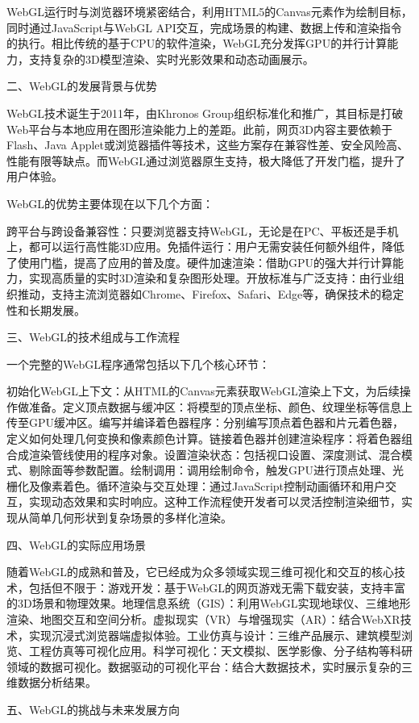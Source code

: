 WebGL运行时与浏览器环境紧密结合，利用HTML5的Canvas元素作为绘制目标，同时通过JavaScript与WebGL API交互，完成场景的构建、数据上传和渲染指令的执行。相比传统的基于CPU的软件渲染，WebGL充分发挥GPU的并行计算能力，支持复杂的3D模型渲染、实时光影效果和动态动画展示。

二、WebGL的发展背景与优势

WebGL技术诞生于2011年，由Khronos Group组织标准化和推广，其目标是打破Web平台与本地应用在图形渲染能力上的差距。此前，网页3D内容主要依赖于Flash、Java Applet或浏览器插件等技术，这些方案存在兼容性差、安全风险高、性能有限等缺点。而WebGL通过浏览器原生支持，极大降低了开发门槛，提升了用户体验。

WebGL的优势主要体现在以下几个方面：

跨平台与跨设备兼容性：只要浏览器支持WebGL，无论是在PC、平板还是手机上，都可以运行高性能3D应用。免插件运行：用户无需安装任何额外组件，降低了使用门槛，提高了应用的普及度。硬件加速渲染：借助GPU的强大并行计算能力，实现高质量的实时3D渲染和复杂图形处理。开放标准与广泛支持：由行业组织推动，支持主流浏览器如Chrome、Firefox、Safari、Edge等，确保技术的稳定性和长期发展。

三、WebGL的技术组成与工作流程

一个完整的WebGL程序通常包括以下几个核心环节：

初始化WebGL上下文：从HTML的Canvas元素获取WebGL渲染上下文，为后续操作做准备。定义顶点数据与缓冲区：将模型的顶点坐标、颜色、纹理坐标等信息上传至GPU缓冲区。编写并编译着色器程序：分别编写顶点着色器和片元着色器，定义如何处理几何变换和像素颜色计算。链接着色器并创建渲染程序：将着色器组合成渲染管线使用的程序对象。设置渲染状态：包括视口设置、深度测试、混合模式、剔除面等参数配置。绘制调用：调用绘制命令，触发GPU进行顶点处理、光栅化及像素着色。循环渲染与交互处理：通过JavaScript控制动画循环和用户交互，实现动态效果和实时响应。这种工作流程使开发者可以灵活控制渲染细节，实现从简单几何形状到复杂场景的多样化渲染。

四、WebGL的实际应用场景

随着WebGL的成熟和普及，它已经成为众多领域实现三维可视化和交互的核心技术，包括但不限于：游戏开发：基于WebGL的网页游戏无需下载安装，支持丰富的3D场景和物理效果。地理信息系统（GIS）：利用WebGL实现地球仪、三维地形渲染、地图交互和空间分析。虚拟现实（VR）与增强现实（AR）：结合WebXR技术，实现沉浸式浏览器端虚拟体验。工业仿真与设计：三维产品展示、建筑模型浏览、工程仿真等可视化应用。科学可视化：天文模拟、医学影像、分子结构等科研领域的数据可视化。数据驱动的可视化平台：结合大数据技术，实时展示复杂的三维数据分析结果。

五、WebGL的挑战与未来发展方向

